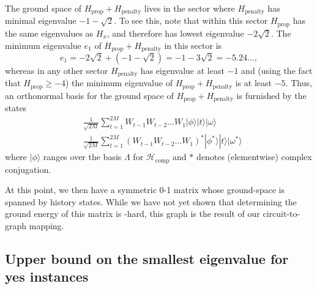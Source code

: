 \documentclass[../thesis-main/thesis-main]{subfiles}
\begin{document}
The ground space of $H_{\text{prop}}+H_{\text{penalty}}$ lives in the sector where $H_{\text{penalty}}$ has minimal eigenvalue $-1-\sqrt{2}$. To see this, note that within this sector $H_{\text{prop}}$ has the same eigenvalues as $H_{x}$, and therefore has lowest eigenvalue $-2\sqrt{2}$. The minimum eigenvalue $e_{1}$ of $H_{\text{prop}}+H_{\text{penalty}}$ in this sector is 
\begin{equation}
e_{1}=-2\sqrt{2}+\left(-1-\sqrt{2}\right)=-1-3\sqrt{2}=-5.24\ldots,\label{eq:e_1_definition-1}
\end{equation}
whereas in any other sector $H_{\text{penalty}}$ has eigenvalue at least $-1$ and (using the fact that $H_{\text{prop}}\geq-4$) the minimum eigenvalue of $H_{\text{prop}}+H_{\text{penalty}}$ is at least $-5.$ Thus, an orthonormal basis for the ground space of $H_{\text{prop}}+H_{\mathrm{penalty}}$ is furnished by the states 
\begin{align}
 & \frac{1}{\sqrt{2M}}\sum_{t=1}^{2M}W_{t-1}W_{t-2}\ldots W_{1}|\phi\rangle|t\rangle|\omega\rangle\label{eq:gs_Hprop_Hpen1}\\
 & \frac{1}{\sqrt{2M}}\sum_{t=1}^{2M}(W_{t-1}W_{t-2}\ldots W_{1})^{*}|\phi^{*}\rangle|t\rangle|\omega^{*}\rangle\label{eq:gs_Hprop_Hpen2}
\end{align}
where $|\phi\rangle$ ranges over the basis $\Lambda$ for $\mathcal{H}_{\text{comp}}$ and $*$ denotes (elementwise) complex conjugation. 

At this point, we then have a symmetric 0-1 matrix whose ground-space is spanned by history states.  While we have not yet shown that determining the ground energy of this matrix is \QMA-hard, this graph is the result of our circuit-to-graph mapping.

\subsection{Upper bound on the smallest eigenvalue for yes instances}
\label{sec:mappingyes}
\end{document}
